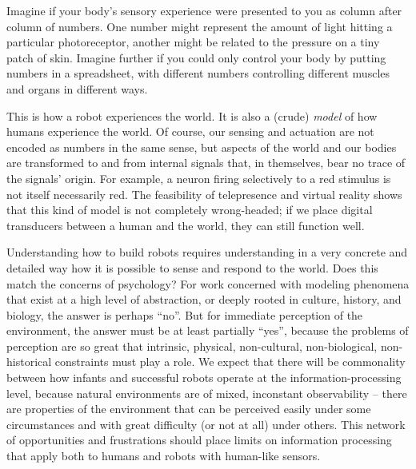 


Imagine if your body's sensory experience were presented to you as
column after column of numbers.  One number might represent the amount
of light hitting a particular photoreceptor, another might be related
to the pressure on a tiny patch of skin.  Imagine further if you could
only control your body by putting numbers in a spreadsheet, with
different numbers controlling different muscles and organs in
different ways.

This is how a robot experiences the world.  It is also a (crude) {\em
model} of how humans experience the world.  Of course, our sensing and
actuation are not encoded as numbers in the same sense, but aspects of
the world and our bodies are transformed to and from internal signals that,
in themselves, bear no trace of the signals' origin.  For 
example, a neuron firing
selectively to a red stimulus is not itself necessarily red.  The
feasibility of telepresence and virtual reality shows that this kind of
model is not completely wrong-headed; if we place digital transducers
between a human and the world, they can still function well.

Understanding how to build robots requires understanding in a very
concrete and detailed way how it is possible to sense and respond to
the world.  Does this match the concerns of psychology?  For work
concerned with modeling phenomena that exist at a high level of
abstraction, or deeply rooted in culture, history, and biology, the
answer is perhaps ``no''.  But for immediate perception of the
environment, the answer must be at least partially ``yes'', because the
problems of perception are so great that intrinsic, physical,
non-cultural, non-biological, non-historical constraints must play a
role.
%
%
%
%
%
%
%
%
%
%
%
We expect
that there will be commonality between how infants and successful
robots operate at the information-processing level, because natural
environments are of mixed, inconstant observability -- there are
properties of the environment that can be perceived easily under some
circumstances and with great difficulty (or not at all) under others.  
This network of opportunities and
frustrations should place limits on information processing that apply
both to humans and robots with human-like sensors.

